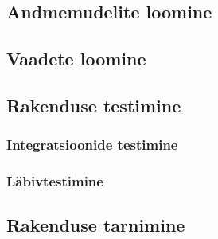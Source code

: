 \subsection{Andmemudelite loomine}

\subsection{Vaadete loomine}

\subsection{Rakenduse testimine}

\subsubsection{Integratsioonide testimine}

\subsubsection{Läbivtestimine}

\subsection{Rakenduse tarnimine}

